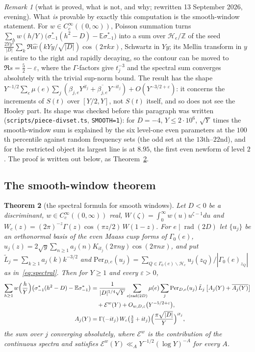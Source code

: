 \documentclass[11pt,a4paper]{article}
\newtheorem{theorem}{Theorem}
\theoremstyle{remark}\newtheorem{remark}[theorem]{Remark}
\newcommand{\Z}{\mathbb Z}\newcommand{\R}{\mathbb R}\newcommand{\Q}{\mathbb Q}\newcommand{\C}{\mathbb C}
\begin{document}
\begin{remark}[what is proved, what is not, and why; rewritten 13 September 2026, evening]
What \emph{is} provable by exactly this computation is the smooth-window statement. For $w\in C_c^\infty((0,\infty))$,
Poisson summation turns $\sum_hw(h/Y)\bigl(\sigma^*_{-1}(h^2-D)-\mathbb E\sigma^*_{-1}\bigr)$ into a sum over $\mathcal H_e/\Z$ of the
seed $\tfrac{2Yy^2}{|D|}\sum_k\Re\hat w(kYy/\sqrt{|D|})\cos(2\pi kx)$, Schwartz in $Yy$; its Mellin transform in $y$ is entire
to the right and rapidly decaying, so the contour can be moved to $\Re s=\tfrac52-\varepsilon$, where the $\Gamma$-factors
give $t_j^{-3}$ and the spectral sum converges absolutely with the trivial sup-norm bound. The result has the shape
$Y^{-1/2}\sum_e\mu(e)\sum_j(\beta_{j,e}Y^{it_j}+\overline{\beta_{j,e}}Y^{-it_j})+O(Y^{-3/2+\varepsilon})$: it concerns the
increments of $S(t)$ over $[Y/2,Y]$, not $S(t)$ itself, and so does not see the Hooley part. Its shape was checked
before this paragraph was written (\texttt{scripts/piece-divset.ts}, \texttt{SMOOTH=1}): for $D=-4$, $Y\le2\cdot10^6$,
$\sqrt Y$ times the smooth-window sum is explained by the six level-one even parameters at the $100$th percentile
against random frequency sets (the odd set at the $13$th--$22$nd), and for the restricted object its largest line is
at $8.95$, the first even newform of level $2$. The proof is written out below, as Theorem~\ref{thm:smooth}.
\end{remark}

\subsection{The smooth-window theorem}\label{sec:smooth}

\begin{theorem}[the spectral formula for smooth windows]\label{thm:smooth}
Let $D<0$ be a discriminant, $w\in C_c^\infty((0,\infty))$ real, $W(\zeta)=\int_0^\infty w(u)u^{\zeta-1}du$ and
$W_c(z)=(2\pi)^{-z}\Gamma(z)\cos(\pi z/2)\,W(1-z)$. For $e\mid\operatorname{rad}(2D)$ let $\{u_j\}$ be an orthonormal basis of
the even Maass cusp forms of $\Gamma_0(e)$, $u_j(z)=2\sqrt y\sum_{n\ge1}a_j(n)K_{it_j}(2\pi ny)\cos(2\pi nx)$, and put
$\tilde L_j=\sum_{k\ge1}a_j(k)k^{-3/2}$ and $\mathrm{Per}_{D,e}(u_j)=\sum_{Q\in\Gamma_0(e)\backslash\mathcal H_e}u_j(z_Q)/|\Gamma_0(e)_{z_Q}|$
as in~\eqref{eq:spectral}. Then for $Y\ge1$ and every $\varepsilon>0$,
\[
\begin{aligned}
\sum_{h\ge1}w\Bigl(\frac hY\Bigr)\bigl(\sigma^*_{-1}(h^2-D)-\mathbb E\sigma^*_{-1}\bigr)
&=\frac{1}{|D|^{1/4}\sqrt Y}\sum_{e\mid\operatorname{rad}(2D)}\mu(e)\sum_j\mathrm{Per}_{D,e}(u_j)\,\tilde L_j\,\bigl[A_j(Y)+\overline{A_j(Y)}\bigr]\\
&\quad+\mathcal E^w(Y)+O_{w,D,\varepsilon}\bigl(Y^{-5/2+\varepsilon}\bigr),\\
A_j(Y)&=\Gamma(-it_j)\,W_c\bigl(\tfrac32+it_j\bigr)\Bigl(\frac{\pi\sqrt{|D|}}Y\Bigr)^{it_j},
\end{aligned}
\]
the sum over $j$ converging absolutely, where $\mathcal E^w$ is the contribution of the continuous spectra and
satisfies $\mathcal E^w(Y)\ll_{A}Y^{-1/2}(\log Y)^{-A}$ for every $A$.
\end{theorem}
\end{document}
